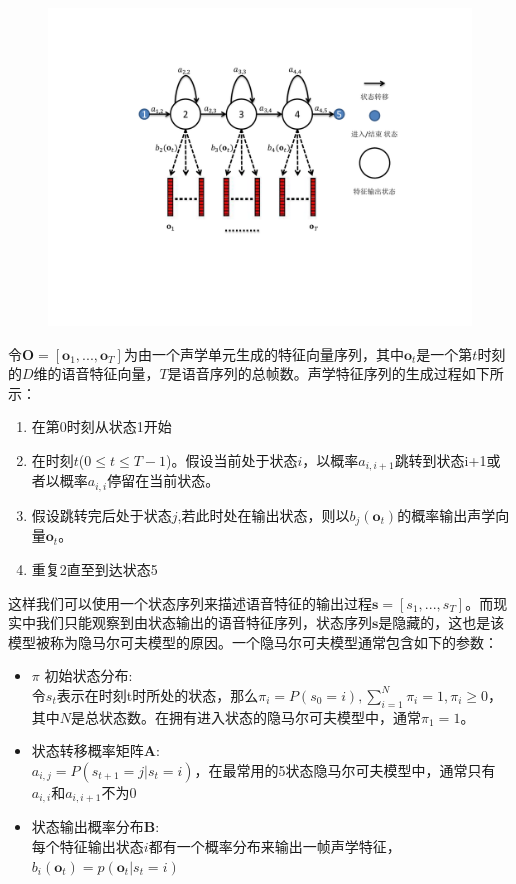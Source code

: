 \begin{figure}[!htp]
  \centering
    \captionstyle{\centering}
    \includegraphics[trim = 3cm 5cm 4cm 3cm, clip=true, width=.7\textwidth]{figure/hmm.pdf}
\end{figure}

令$\mathbf{O}=[\mathbf{o}_1, ..., \mathbf{o}_T]$为由一个声学单元生成的特征向量序列，其中$\mathbf{o}_t$是一个第$t$时刻的$D$维的语音特征向量，$T$是语音序列的总帧数。声学特征序列的生成过程如下所示：
\begin{enumerate}
    \item 在第0时刻从状态1开始
    \item 在时刻$t$($0 \le t \le T-1$)。假设当前处于状态$i$，以概率$a_{i,i+1}$跳转到状态i+1或者以概率$a_{i,i}$停留在当前状态。
    \item 假设跳转完后处于状态$j$,若此时处在输出状态，则以$b_j(\mathbf{o}_t)$的概率输出声学向量$\mathbf{o}_t$。
    \item 重复2直至到达状态5
\end{enumerate}

这样我们可以使用一个状态序列来描述语音特征的输出过程$\mathbf{s}=[s_1, ..., s_T]$。而现实中我们只能观察到由状态输出的语音特征序列，状态序列$\mathbf{s}$是隐藏的，这也是该模型被称为隐马尔可夫模型的原因。一个隐马尔可夫模型通常包含如下的参数：
\begin{itemize}
    \item $\pi$ 初始状态分布: \\
    令$s_t$表示在时刻t时所处的状态，那么$\pi_i = P(s_0=i), \sum_{i=1}^N \pi_i = 1, \pi_i \ge 0$，其中$N$是总状态数。在拥有进入状态的隐马尔可夫模型中，通常$\pi_1=1$。
    \item 状态转移概率矩阵$\mathbf{A}$: \\
    $a_{i,j}=P(s_{t+1}=j|s_t=i)$，在最常用的5状态隐马尔可夫模型中，通常只有$a_{i,i}和a_{i,i+1}$不为0
    \item 状态输出概率分布$\mathbf{B}$: \\
    每个特征输出状态$i$都有一个概率分布来输出一帧声学特征，$b_i(\mathbf{o}_t)=p(\mathbf{o}_t|s_t=i)$
\end{itemize}

